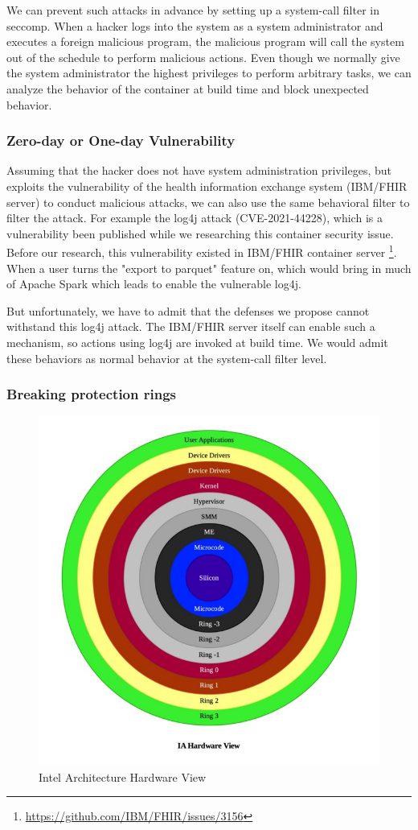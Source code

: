 We can prevent such attacks in advance by setting up a system-call filter
in seccomp. When a hacker logs into the system as a system administrator
and executes a foreign malicious program, the malicious program will call
the system out of the schedule to perform malicious actions.
Even though we normally give the system administrator the highest privileges
to perform arbitrary tasks, we can analyze the behavior of the container
at build time and block unexpected behavior.

\subsubsection{Zero-day or One-day Vulnerability}
Assuming that the hacker does not have system administration privileges,
but exploits the vulnerability of the health information exchange system
(IBM/FHIR server) to conduct malicious attacks, we can also use the same
behavioral filter to filter the attack.
For example the log4j attack (CVE-2021-44228), which is a vulnerability
been published while we researching this container security issue.
Before our research, this vulnerability existed in IBM/FHIR container server
\footnote{\url{https://github.com/IBM/FHIR/issues/3156}}.
When a user turns the "export to parquet" feature on, which would
bring in much of Apache Spark which leads to enable the vulnerable log4j.

But unfortunately, we have to admit that the defenses we propose cannot
withstand this log4j attack. The IBM/FHIR server itself can enable such a mechanism,
so actions using log4j are invoked at build time. We would admit these
behaviors as normal behavior at the system-call filter level.

\subsubsection{Breaking protection rings}

\begin{figure}
    \centering
    \includegraphics[width=.5\textwidth]{src/ring.jpeg}
    \caption{Intel Architecture Hardware View}
    \label{ring}
\end{figure}

